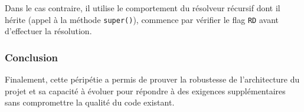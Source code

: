 Dans le cas contraire, il utilise le comportement du résolveur récursif dont il hérite (appel à la méthode \texttt{super()}), commence par vérifier le flag \texttt{RD}  avant d'effectuer la résolution.

\subsubsection{Conclusion}
Finalement, cette péripétie a permis de prouver la robustesse de l'architecture du projet et sa capacité à évoluer pour répondre à des exigences supplémentaires sans compromettre la qualité du code existant.